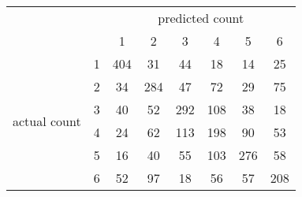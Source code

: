 
\begin{tabular}{*{8}{c}}
& & \multicolumn{6}{c}{predicted count} \\
& & 1 & 2 & 3 & 4 & 5 & 6 \\
\multirow{6}{*}{\begin{sideways}actual count\end{sideways}}
& 1 & \cellcolor[rgb]{0.000000,1.000000,0.000000}404 & \cellcolor[rgb]{0.987315,0.012685,0.000000}31 & \cellcolor[rgb]{0.967214,0.032786,0.000000}44 & \cellcolor[rgb]{0.995154,0.004846,0.000000}18 & \cellcolor[rgb]{0.996400,0.003600,0.000000}14 & \cellcolor[rgb]{0.991856,0.008144,0.000000}25 \\
& 2 & \cellcolor[rgb]{0.984543,0.015457,0.000000}34 & \cellcolor[rgb]{0.000001,0.999999,0.000000}284 & \cellcolor[rgb]{0.960568,0.039432,0.000000}47 & \cellcolor[rgb]{0.793233,0.206767,0.000000}72 & \cellcolor[rgb]{0.989269,0.010731,0.000000}29 & \cellcolor[rgb]{0.754492,0.245508,0.000000}75 \\
& 3 & \cellcolor[rgb]{0.976984,0.023016,0.000000}40 & \cellcolor[rgb]{0.946464,0.053536,0.000000}52 & \cellcolor[rgb]{0.000000,1.000000,0.000000}292 & \cellcolor[rgb]{0.228780,0.771220,0.000000}108 & \cellcolor[rgb]{0.980048,0.019952,0.000000}38 & \cellcolor[rgb]{0.995294,0.004706,0.000000}18 \\
& 4 & \cellcolor[rgb]{0.992536,0.007464,0.000000}24 & \cellcolor[rgb]{0.888490,0.111510,0.000000}62 & \cellcolor[rgb]{0.154156,0.845844,0.000000}113 & \cellcolor[rgb]{0.000336,0.999664,0.000000}198 & \cellcolor[rgb]{0.500333,0.499667,0.000000}90 & \cellcolor[rgb]{0.939464,0.060536,0.000000}53 \\
& 5 & \cellcolor[rgb]{0.995930,0.004070,0.000000}16 & \cellcolor[rgb]{0.976984,0.023016,0.000000}40 & \cellcolor[rgb]{0.934220,0.065780,0.000000}55 & \cellcolor[rgb]{0.299381,0.700619,0.000000}103 & \cellcolor[rgb]{0.000001,0.999999,0.000000}276 & \cellcolor[rgb]{0.919415,0.080585,0.000000}58 \\
& 6 & \cellcolor[rgb]{0.917261,0.082739,0.000000}52 & \cellcolor[rgb]{0.217071,0.782929,0.000000}97 & \cellcolor[rgb]{0.994473,0.005527,0.000000}18 & \cellcolor[rgb]{0.888730,0.111270,0.000000}56 & \cellcolor[rgb]{0.880363,0.119637,0.000000}57 & \cellcolor[rgb]{0.000031,0.999969,0.000000}208 \\
\end{tabular}
